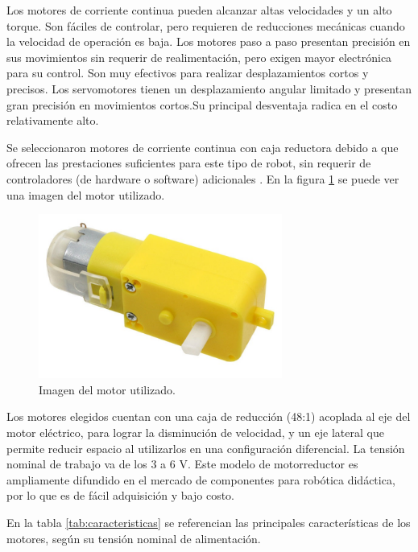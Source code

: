 Los motores de corriente continua pueden alcanzar altas velocidades y un alto torque. Son fáciles de controlar, pero requieren de reducciones mecánicas cuando la velocidad de operación es baja.
Los motores paso a paso presentan precisión en sus movimientos sin requerir de realimentación,  pero exigen mayor electrónica para su control. Son muy efectivos para realizar desplazamientos cortos y precisos. Los servomotores  tienen un desplazamiento angular limitado y presentan gran precisión en movimientos cortos.Su principal  desventaja radica en el costo relativamente alto.

Se seleccionaron motores de corriente continua con caja reductora debido a que ofrecen las prestaciones suficientes para este tipo de robot, sin requerir de controladores (de hardware o software) adicionales \citep{motorcc}. 
En la figura \ref{fig:motorreductor} se puede ver una imagen del motor utilizado.

\begin{figure}[h]
	\centering
	\includegraphics[width=8cm]{./Figures/Motorreductor.jpg}
	\caption{Imagen del motor utilizado\protect\footnotemark.}
	\label{fig:motorreductor}
\end{figure}

Los motores elegidos cuentan con una caja de reducción (48:1) acoplada al eje del motor eléctrico, para lograr la disminución de velocidad, y un eje lateral que permite reducir espacio al utilizarlos en una configuración diferencial. La tensión nominal de trabajo va de los  3 a 6 V. Este modelo de motorreductor es ampliamente difundido en el mercado de componentes para robótica didáctica, por lo que es de fácil adquisición y bajo costo. 

En la tabla \ref{tab:caracteristicas} se referencian las principales características de los motores, según su tensión nominal de alimentación. 

